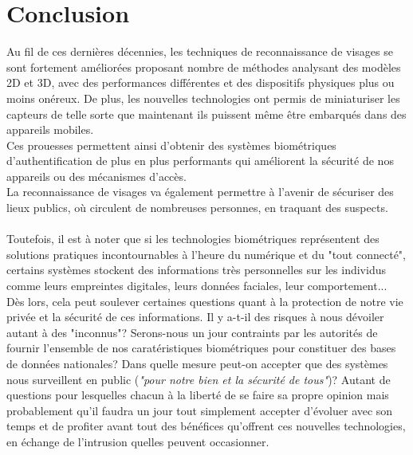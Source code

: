 \section{Conclusion}
Au fil de ces dernières décennies, les techniques de reconnaissance de visages se sont fortement améliorées proposant nombre de méthodes analysant des modèles 2D et 3D, avec des performances différentes et des dispositifs physiques plus ou moins onéreux. De plus, les nouvelles technologies ont permis de miniaturiser les capteurs de telle sorte que maintenant ils puissent même être embarqués dans des appareils mobiles.
\\Ces prouesses permettent ainsi d'obtenir des systèmes biométriques d'authentification de plus en plus performants qui améliorent la sécurité de nos appareils ou des mécanismes d'accès.
\\La reconnaissance de visages va également permettre à l'avenir de sécuriser des lieux publics, où circulent de nombreuses personnes, en traquant des suspects.
\paragraph{}Toutefois, il est à noter que si les technologies biométriques représentent des solutions pratiques incontournables à l'heure du numérique et du "tout connecté", certains systèmes stockent des informations très personnelles sur les individus comme leurs empreintes digitales, leurs données faciales, leur comportement... Dès lors, cela peut soulever certaines questions quant à la protection de notre vie privée et la sécurité de ces informations. Il y a-t-il des risques à nous dévoiler autant à des "inconnus"? Serons-nous un jour contraints par les autorités de fournir l'ensemble de nos caratéristiques biométriques pour constituer des bases de données nationales? Dans quelle mesure peut-on accepter que des systèmes nous surveillent en public (\textit{"pour notre bien et la sécurité de tous"})? Autant de questions pour lesquelles chacun à la liberté de se faire sa propre opinion mais probablement qu'il faudra un jour tout simplement accepter d'évoluer avec son temps et de profiter avant tout des bénéfices qu'offrent ces nouvelles technologies, en échange de l'intrusion quelles peuvent occasionner.